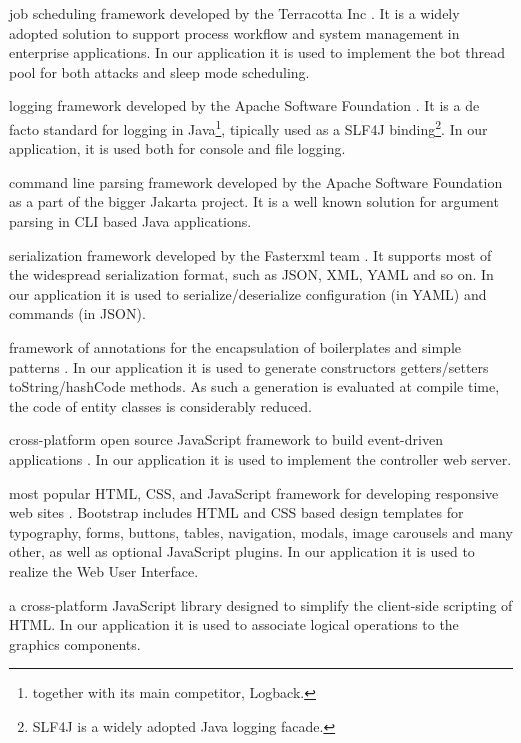\begin{description}
  \setlength\itemsep{1em}

  \item[QUARTZ] job scheduling framework developed by the Terracotta Inc \cite{quartz-scheduler}.
  It is a widely adopted solution to support process workflow and system management in enterprise applications.
  In our application it is used to implement the bot thread pool for both attacks and sleep mode scheduling.

  \item[LOG4J2] logging framework developed by the Apache Software Foundation \cite{log4j2}.
  It is a de facto standard for logging in Java\footnote{together with its main competitor, Logback.}, tipically used as a SLF4J binding\footnote{SLF4J is a widely adopted Java logging facade.}.
  In our application, it is used both for console and file logging.

  \item[COMMONS CLI] command line parsing framework developed by the Apache Software Foundation as a part of the bigger Jakarta project\cite{commons-cli}.
  It is a well known solution for argument parsing in CLI based Java applications.

  \item[JACKSON] serialization framework developed by the Fasterxml team \cite{jackson}.
  It supports most of the widespread serialization format, such as JSON, XML, YAML and so on.
  In our application it is used to serialize/deserialize configuration (in YAML) and commands (in JSON).

  \item[LOMBOK] framework of annotations for the encapsulation of boilerplates and simple patterns \cite{lombok}.
  In our application it is used to generate constructors getters/setters toString/hashCode methods. As such a generation is evaluated at compile time, the code of entity classes is considerably reduced.

  \item[NODE.JS] cross-platform open source JavaScript framework to build event-driven applications \cite{nodejs,npm}. In our application it is used to implement the controller web server.

  \item[BOOTSTRAP] most popular HTML, CSS, and JavaScript framework for developing responsive web sites \cite{bootstrap}. Bootstrap includes HTML and CSS based design templates for typography, forms, buttons, tables, navigation, modals, image carousels and many other, as well as optional JavaScript plugins. In our application it is used to realize the Web User Interface.

  \item[JQUERY] a cross-platform JavaScript library designed to simplify the client-side scripting of HTML\cite{jquery}. In our application it is used to associate logical operations to the graphics components.

\end{description}


